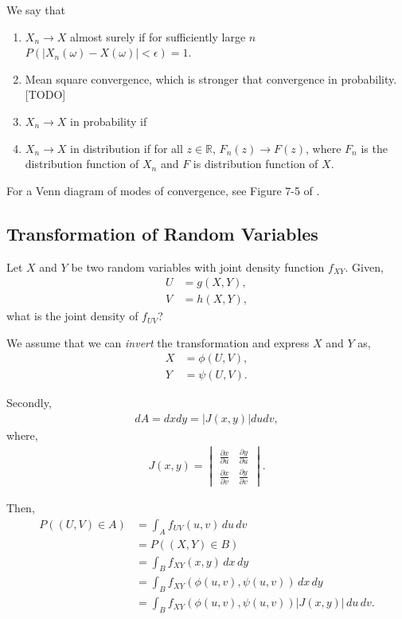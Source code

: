 \documentclass{amsart}
\theoremstyle{plain}
\numberwithin{equation}{section}
\begin{document}
We say that 
\begin{enumerate}
\item $X_n \to X$ almost surely 
if for sufficiently large $n$
$P(|X_n(\omega)-X(\omega)| < \epsilon) = 1$.

\item Mean square convergence, which is 
stronger that convergence in probability. 
[TODO]


\item $X_n \to X$ in probability 
if 

\item $X_n \to X$ in distribution
if for all $z \in \mathbb{R}$, 
$F_n(z) \to F(z)$, where
$F_n$ is the distribution function of 
$X_n$ and $F$ is distribution function 
of $X$.


\end{enumerate}

For a Venn diagram of modes of convergence, 
see Figure 7-5 of \cite{papoulis2002probability}.

\subsection{Transformation of Random Variables}
Let $X$ and $Y$ be two random variables with joint 
density function $f_{XY}$. Given,
\begin{align*}
U &= g(X, Y),\\
V &= h(X, Y),
\end{align*}
what is the joint density of $f_{UV}$?

We assume that we can \emph{invert} the transformation 
and express $X$ and $Y$ as,
\begin{align*}
X &= \phi(U, V),\\
Y &= \psi(U, V).
\end{align*}

Secondly,
\begin{align*}
dA = dx dy = \left|J(x, y)\right| du dv,
\end{align*}
where,
\begin{align*}
J(x, y) = 
\begin{vmatrix}
\frac{\partial x}{\partial u} & \frac{\partial y}{\partial u}\\
\frac{\partial x}{\partial v} & \frac{\partial y}{\partial v}
\end{vmatrix}.
\end{align*}

Then,
\begin{align*}
P((U,V) \in A) &= \int_{A} f_{UV}(u, v) \,du \,dv \\
&= P((X,Y) \in B)\\
&= \int_{B} f_{XY}(x, y) \,dx \,dy \\
&= \int_{B} f_{XY}(\phi(u,v), \psi(u,v)) \,dx \,dy \\
&= \int_{B} f_{XY}(\phi(u,v), \psi(u,v)) \left|J(x, y)\right|\,du \,dv.\\
\end{align*}
\end{document}
